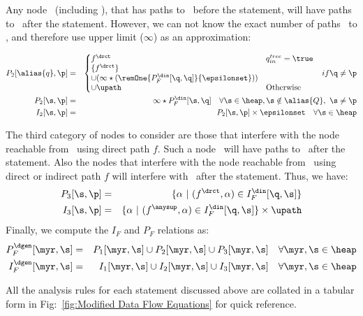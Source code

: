 \begin{enumerate}
Any node \s\ (including \q), that has paths to \q\ before the
statement, will have paths to \p\ after the
statement. However, we can not know the exact number of paths
\s\ to \p, and therefore use upper limit ($\infty$) as an
approximation:

{\blue 
\begin{eqnarray*}
P_2[\alias{q},\p] &=& \left\{\begin{array}{@{}ll}
	f^{\drct} & q_{in}^{tree}=\true \\
	\{ f^{\drct}\}  \\
		\cup (\infty \star (\remOne{P_F^{\din}[\q, \q]}{\epsilonset})) \\
		\cup \upath &  \mbox{Otherwise} 
	\end{array}\right.  \ if \q \not = \p \\
  P_2[\s, \p] &=& \infty \star P_F^{\din}[\s, \q] \quad \forall \s \in \heap, \s \notin \alias{Q},\ \s \not=\p \\
  I_2[\s, \p] &=& P_2[\s, \p] \times \epsilonset \quad \forall \s \in \heap 	 \\
\end{eqnarray*}
}

The third category of nodes to consider are those that
interfere with the node reachable from \q\ using direct path
$f$. Such a node \s\ will have paths to \p\ after the
statement. Also the nodes that interfere with the node reachable from \q\ using direct or indirect path
$f$ will interfere with \p\ after the statement. Thus, we have:
\begin{eqnarray*}
  P_3[\s, \p] &=& \{ \alpha \ \vert \ (f^{\drct}, \alpha) \in I_F^{\din}[\q, \s] \}  \\
  I_3[\s, \p] &=& \{\alpha \ \vert\ (f^\anysup, \alpha) \in I_F^{\din}[\q, \s]\} \times \upath 
\end{eqnarray*}
Finally, we compute the $I_F$ and $P_F$ relations as:
\begin{eqnarray*}
P_F^{\dgen}[\myr, \s] &= & P_1[\myr, \s] \cup P_2[\myr, \s] \cup P_3[\myr, \s] \quad \forall\myr,\s \in \heap  \\
I_F^{\dgen}[\myr, \s] &= & I_1[\myr, \s] \cup I_2[\myr, \s] \cup I_3[\myr, \s] \quad \forall\myr,\s \in \heap 
\end{eqnarray*}
\end{enumerate}

{\blue
All the analysis rules for each statement discussed above are collated in a tabular form in  Fig:~\ref{fig:Modified Data Flow Equations}
for quick reference.
}

